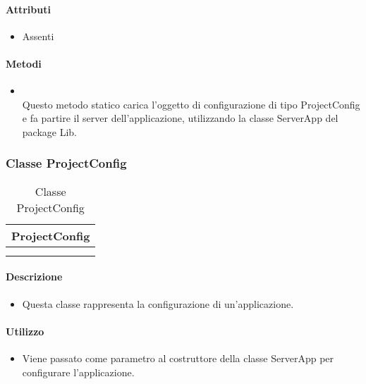 \paragraph*{Attributi}
\begin{itemize}
\item[] Assenti
\end{itemize}

\paragraph*{Metodi}
\begin{itemize}
\item[]  \\ Questo metodo statico carica l'oggetto di configurazione di tipo ProjectConfig e fa partire il server dell'applicazione, utilizzando la classe ServerApp del package Lib.
\end{itemize}

\subsubsection{Classe ProjectConfig}

\begin{table}[H]
\begin{center}
\bgroup
\setlength{\arrayrulewidth}{0.6mm}
\def\arraystretch{1}
\begin{tabular}{ | p{12cm} | }
\hline
\centerline{\textbf{ProjectConfig}}
\\ \hline
 \\ 
\hline
 \\ 
\hline
\end{tabular}
\egroup
\caption{Classe ProjectConfig}
\end{center}
\end{table}

\paragraph*{Descrizione}
\begin{itemize}
\item[] Questa classe rappresenta la configurazione di un'applicazione.
\end{itemize}

\paragraph*{Utilizzo}
\begin{itemize}
\item[] Viene passato come parametro al costruttore della classe ServerApp per configurare l'applicazione.
\end{itemize}

